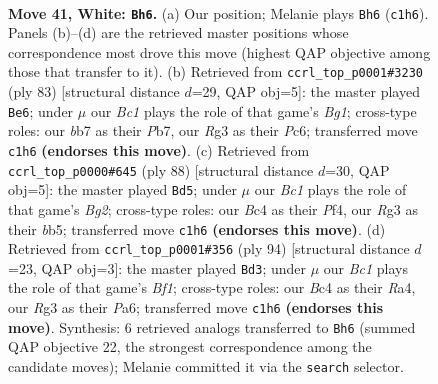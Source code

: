 \documentclass[11pt]{article}
\begin{document}
\clearpage

\begin{figure}[p]\centering
\begin{subfigure}{0.46\textwidth}\centering
\resizebox{\linewidth}{!}{%
\newchessgame
\chessboard[
  setfen={4r3/pb1p4/8/5k2/2B5/6R1/PPK2n2/2B5 w - - 2 41},
  showmover=false,
  pgfstyle=straightmove, color=movearrow, markmove={c1-h6}
]}
\caption{}
\end{subfigure}\hfill
\begin{subfigure}{0.46\textwidth}\centering
\resizebox{\linewidth}{!}{%
\newchessgame
\chessboard[
  setfen={6bk/1p5p/2p5/p7/P3N1PP/8/1P6/6K1 b - - 0 42},
  showmover=false,
  pgfstyle=straightmove, color=movearrow, markmove={g8-e6}
]}
\caption{}
\end{subfigure}
\\[4pt]
\begin{subfigure}{0.46\textwidth}\centering
\resizebox{\linewidth}{!}{%
\newchessgame
\chessboard[
  setfen={5k2/5n1p/6p1/1bN5/5P2/6PP/6BK/8 w - - 1 45},
  showmover=false,
  pgfstyle=straightmove, color=movearrow, markmove={g2-d5}
]}
\caption{}
\end{subfigure}\hfill
\begin{subfigure}{0.46\textwidth}\centering
\resizebox{\linewidth}{!}{%
\newchessgame
\chessboard[
  setfen={3k4/p7/P2n2p1/7r/R7/5P2/8/4KB2 w - - 0 48},
  showmover=false,
  pgfstyle=straightmove, color=movearrow, markmove={f1-d3}
]}
\caption{}
\end{subfigure}
\caption{\textbf{Move 41, White: \texttt{Bh6}.} (a) Our position; Melanie plays \texttt{Bh6} (\texttt{c1h6}). Panels (b)--(d) are the retrieved master positions whose correspondence most drove this move (highest QAP objective among those that transfer to it). (b) Retrieved from \texttt{ccrl\_top\_p0001\#3230} (ply 83) [structural distance $d$=29, QAP obj=5]: the master played \texttt{Be6}; under $\mu$ our \emph{Bc1} plays the role of that game's \emph{Bg1}; cross-type roles: our \emph{b}b7 as their \emph{P}b7, our \emph{R}g3 as their \emph{P}c6; transferred move \texttt{c1h6} \textbf{(endorses this move)}. (c) Retrieved from \texttt{ccrl\_top\_p0000\#645} (ply 88) [structural distance $d$=30, QAP obj=5]: the master played \texttt{Bd5}; under $\mu$ our \emph{Bc1} plays the role of that game's \emph{Bg2}; cross-type roles: our \emph{B}c4 as their \emph{P}f4, our \emph{R}g3 as their \emph{b}b5; transferred move \texttt{c1h6} \textbf{(endorses this move)}. (d) Retrieved from \texttt{ccrl\_top\_p0001\#356} (ply 94) [structural distance $d$=23, QAP obj=3]: the master played \texttt{Bd3}; under $\mu$ our \emph{Bc1} plays the role of that game's \emph{Bf1}; cross-type roles: our \emph{B}c4 as their \emph{R}a4, our \emph{R}g3 as their \emph{P}a6; transferred move \texttt{c1h6} \textbf{(endorses this move)}. Synthesis: 6 retrieved analogs transferred to \texttt{Bh6} (summed QAP objective 22, the strongest correspondence among the candidate moves); Melanie committed it via the \texttt{search} selector.}
\label{fig:thought-m80}
\end{figure}
\end{document}

